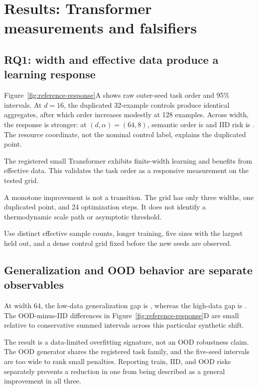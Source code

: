 \section{Results: Transformer measurements and falsifiers}
\label{sec:results}

\subsection{RQ1: width and effective data produce a learning response}

 Figure~\ref{fig:reference-response}A shows raw outer-seed
task order and 95\% intervals. At $d=16$, the duplicated 32-example controls
produce identical aggregates, after which order increases modestly at 128
examples. Across width, the response is stronger: at $(d,\alpha)=(64,8)$,
semantic order is \ReferenceLargestOrder{} and IID risk is
\ReferenceLargestRisk{}. The resource coordinate, not the nominal control
label, explains the duplicated point.

 The registered small Transformer exhibits finite-width
learning and benefits from effective data. This validates the task order as a
responsive measurement on the tested grid.

 A monotone improvement is not a transition. The grid
has only three widths, one duplicated point, and 24 optimization steps. It does
not identify a thermodynamic scale path or asymptotic threshold.

 Use distinct effective sample counts, longer training,
five sizes with the largest held out, and a dense control grid fixed before the
new seeds are observed.

\subsection{Generalization and OOD behavior are separate observables}

At width 64, the low-data generalization gap is \ReferenceLowDataGap{}, whereas
the high-data gap is \ReferenceHighDataGap{}. The OOD-minus-IID differences in
Figure~\ref{fig:reference-response}D are small relative to conservative summed
intervals across this particular synthetic shift.

The result is a data-limited overfitting signature, not an OOD robustness claim.
The OOD generator shares the registered task family, and the five-seed
intervals are too wide to rank small penalties. Reporting train, IID, and OOD
risks separately prevents a reduction in one from being described as a general
improvement in all three.

